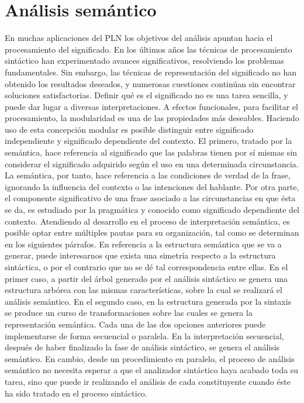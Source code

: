 \section{An\'alisis sem\'antico}

En muchas aplicaciones del PLN los objetivos del an\'alisis apuntan hacia el procesamiento del significado. En los \'ultimos a\~nos las t\'ecnicas de procesamiento sint\'actico han experimentado avances significativos, resolviendo los problemas fundamentales.
Sin embargo, las t\'ecnicas de representaci\'on del significado no han obtenido los resultados deseados, y numerosas cuestiones contin\'uan sin encontrar soluciones satisfactorias.
Definir qu\'e es el significado no es una tarea sencilla, y puede dar lugar a diversas interpretaciones. A efectos funcionales, para facilitar el procesamiento, la modularidad es una de las propiedades m\'as deseables. Haciendo uso de esta concepci\'on modular es posible distinguir entre significado independiente y significado dependiente del contexto.
El primero, tratado por la sem\'antica, hace referencia al significado que las palabras tienen por s\'i mismas sin considerar el significado adquirido seg\'un el uso en una determinada circunstancia. La sem\'antica, por tanto, hace referencia a las condiciones de verdad de la frase, ignorando la influencia del contexto o las intenciones del hablante. Por otra parte, el componente significativo de una frase asociado a las circunstancias en que \'esta se da, es estudiado por la pragm\'atica y conocido como significado dependiente del contexto.
Atendiendo al desarrollo en el proceso de interpretaci\'on sem\'antica, es posible optar entre m\'ultiples pautas para su organizaci\'on, tal como se determinan en los siguientes p\'arrafos.
En referencia a la estructura sem\'antica que se va a generar, puede interesarnos que exista una simetr\'ia respecto a la estructura sint\'actica, o por el contrario que no se d\'e tal correspondencia entre ellas. En el primer caso, a partir del \'arbol generado por el an\'alisis sint\'actico se genera una estructura arb\'orea con las mismas caracter\'isticas, sobre la cual se realizar\'a el an\'alisis sem\'antico. En el segundo caso, en la estructura generada por la sintaxis se produce un curso de transformaciones sobre las cuales se genera la representaci\'on sem\'antica.
Cada una de las dos opciones anteriores puede implementarse de forma secuencial o paralela. En la interpretaci\'on secuencial, despu\'es de haber finalizado la fase de an\'alisis sint\'actico, se genera el an\'alisis sem\'antico. En cambio, desde un procedimiento en paralelo, el proceso de an\'alisis sem\'antico no necesita esperar a que el analizador sint\'actico haya acabado toda su tarea, sino que puede ir realizando el an\'alisis de cada constituyente cuando \'este ha sido tratado en el proceso sint\'actico.
